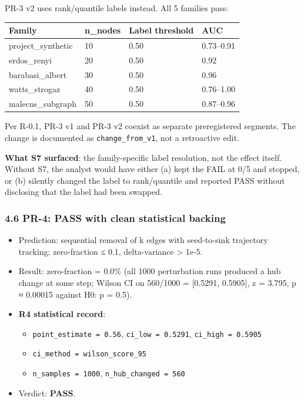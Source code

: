 \documentclass[
]{article}
\newcounter{none} %
\providecommand{\tightlist}{%
  \setlength{\itemsep}{0pt}\setlength{\parskip}{0pt}}
\begin{document}
PR-3 v2 uses rank/quantile labels instead. All 5 families pass:

{\def\LTcaptype{none} %
\begin{longtable}[]{@{}llll@{}}
\toprule\noalign{}
Family & n\_nodes & Label threshold & AUC \\
\midrule\noalign{}
\endhead
\bottomrule\noalign{}
\endlastfoot
project\_synthetic & 10 & 0.50 & 0.73--0.91 \\
erdos\_renyi & 20 & 0.50 & 0.92 \\
barabasi\_albert & 30 & 0.50 & 0.96 \\
watts\_strogaz & 40 & 0.50 & 0.76--1.00 \\
malecns\_subgraph & 50 & 0.50 & 0.87--0.96 \\
\end{longtable}
}

Per R-0.1, PR-3 v1 and PR-3 v2 coexist as separate preregistered
segments. The change is documented as \texttt{change\_from\_v1}, not a
retroactive edit.

\textbf{What S7 surfaced}: the family-specific label resolution, not the
effect itself. Without S7, the analyst would have either (a) kept the
FAIL at 0/5 and stopped, or (b) silently changed the label to
rank/quantile and reported PASS without disclosing that the label had
been swapped.

\subsubsection{4.6 PR-4: PASS with clean statistical
backing}\label{pr-4-pass-with-clean-statistical-backing}

\begin{itemize}
\tightlist
\item
  Prediction: sequential removal of k edges with seed-to-sink trajectory
  tracking; zero-fraction ≤ 0.1, delta-variance \textgreater{} 1e-5.
\item
  Result: zero-fraction = 0.0\% (all 1000 perturbation runs produced a
  hub change at some step; Wilson CI on 560/1000 = {[}0.5291, 0.5905{]},
  z = 3.795, p ≈ 0.00015 against H0: p = 0.5).
\item
  \textbf{R4 statistical record}:

  \begin{itemize}
  \tightlist
  \item
    \texttt{point\_estimate\ =\ 0.56}, \texttt{ci\_low\ =\ 0.5291},
    \texttt{ci\_high\ =\ 0.5905}
  \item
    \texttt{ci\_method\ =\ wilson\_score\_95}
  \item
    \texttt{n\_samples\ =\ 1000}, \texttt{n\_hub\_changed\ =\ 560}
  \end{itemize}
\item
  Verdict: \textbf{PASS}.
\end{itemize}
\end{document}
